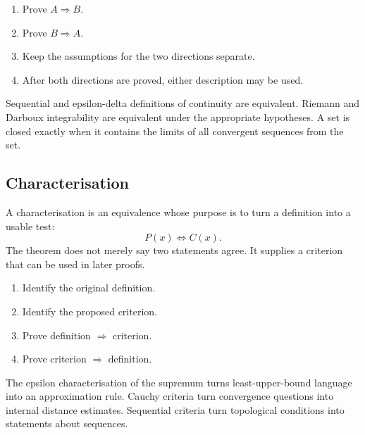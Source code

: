 \begin{remark}
\begin{enumerate}
  \item Prove $A\Rightarrow B$.
  \item Prove $B\Rightarrow A$.
  \item Keep the assumptions for the two directions separate.
  \item After both directions are proved, either description may be used.
\end{enumerate}
\end{remark}

\begin{remark}
Sequential and epsilon-delta definitions of continuity are equivalent.
Riemann and Darboux integrability are equivalent under the appropriate
hypotheses. A set is closed exactly when it contains the limits of all
convergent sequences from the set.
\end{remark}

\subsection*{Characterisation}
\label{subsec:property-characterisation}

A characterisation is an equivalence whose purpose is to turn a definition
into a usable test:
\[
  P(x)\Longleftrightarrow C(x).
\]
The theorem does not merely say two statements agree. It supplies a criterion
that can be used in later proofs.

\begin{remark}
\begin{enumerate}
  \item Identify the original definition.
  \item Identify the proposed criterion.
  \item Prove definition $\Rightarrow$ criterion.
  \item Prove criterion $\Rightarrow$ definition.
\end{enumerate}
\end{remark}

\begin{remark}
The epsilon characterisation of the supremum turns least-upper-bound language
into an approximation rule. Cauchy criteria turn convergence questions into
internal distance estimates. Sequential criteria turn topological conditions
into statements about sequences.
\end{remark}

